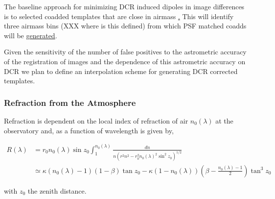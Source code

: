 The baseline approach for minimizing DCR induced dipoles in image
differences is to selected coadded templates that are close in airmass
\hyperref[sec:acRetrievTemplate]. This will identify three airmass bins (XXX
where is this defined) from which PSF matched coadds will be \hyperref[sec:acCoaddition]{generated}.

Given the sensitivity of the number of false positives to the
astrometric accuracy of the registration of images and the dependence
of this astrometric accuracy on DCR we plan to define an interpolation
scheme for generating DCR corrected templates.

\subsubsection{Refraction from the Atmosphere}

Refraction is dependent on the local index of refraction of air $n_0(\lambda)$ at the observatory and, as a function of wavelength is given by, 

\begin{align}
R(\lambda) &= r_0 n_0(\lambda) \sin z_0 \int_1^{n_0(\lambda)} \frac{dn}{n \left(r^2n^2 -r_0^2n_0(\lambda)^2\sin^2z_0\right)^{1/2}} \nonumber\\
&\simeq \kappa (n_0(\lambda) - 1) (1 - \beta) \tan z_0 - \kappa (1 - n_0(\lambda)) \left(\beta - \frac{n_0(\lambda) - 1}{2}\right) \tan^3z_0
\end{align}

with $z_0$ the zenith distance.




